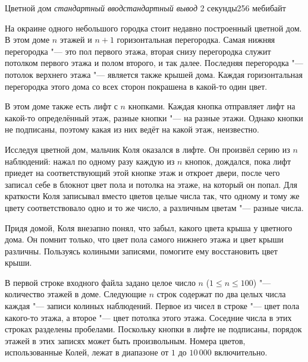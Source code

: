 
\gdef\thisproblemauthor{Иван Казменко}
\begin{problem}{Цветной дом}
{\textsl{стандартный ввод}}{\textsl{стандартный вывод}}
{2 секунды}{256 мебибайт}{}

На окраине одного небольшого городка стоит недавно построенный цветной дом.
В этом доме $n$ этажей и $n + 1$ горизонтальная перегородка.
Самая нижняя перегородка "--- это пол первого этажа,
вторая снизу перегородка служит потолком первого этажа и полом второго,
и так далее.
Последняя перегородка "--- потолок верхнего этажа "--- является также
крышей дома.
Каждая горизонтальная перегородка этого дома со всех сторон покрашена
в какой-то один цвет.

В этом доме также есть лифт с $n$ кнопками.
Каждая кнопка отправляет лифт на какой-то определённый этаж,
разные кнопки "--- на разные этажи.
Однако кнопки не подписаны, поэтому какая из них ведёт на какой этаж,
неизвестно.

Исследуя цветной дом, мальчик Коля оказался в лифте.
Он произвёл серию из $n$ наблюдений: нажал по одному разу каждую из $n$
кнопок, дождался, пока лифт приедет на соответствующий этой кнопке этаж
и откроет двери, после чего записал себе в блокнот цвет пола и потолка
на этаже, на который он попал.
Для краткости Коля записывал вместо цветов целые числа так,
что одному и тому же цвету соответствовало одно и то же число,
а различным цветам "--- разные числа.

Придя домой, Коля внезапно понял, что забыл, какого цвета крыша
у цветного дома.
Он помнит только, что цвет пола самого нижнего этажа и цвет крыши различны.
Пользуясь колиными записями, помогите ему восстановить цвет крыши.

\InputFile


В первой строке входного файла задано целое число $n$ ($1 \le n \le 100$) "---
количество этажей в доме.
Следующие $n$ строк содержат по два целых числа каждая "--- записи
колиных наблюдений.
Первое из чисел в строке "--- цвет пола какого-то этажа, а второе "---
цвет потолка этого этажа.
Соседние числа в этих строках разделены пробелами.
Поскольку кнопки в лифте не подписаны, порядок этажей в этих записях
может быть произвольным.
Номера цветов, использованные Колей, лежат в диапазоне от $1$
до $10\,000$ включительно.


\end{problem}
